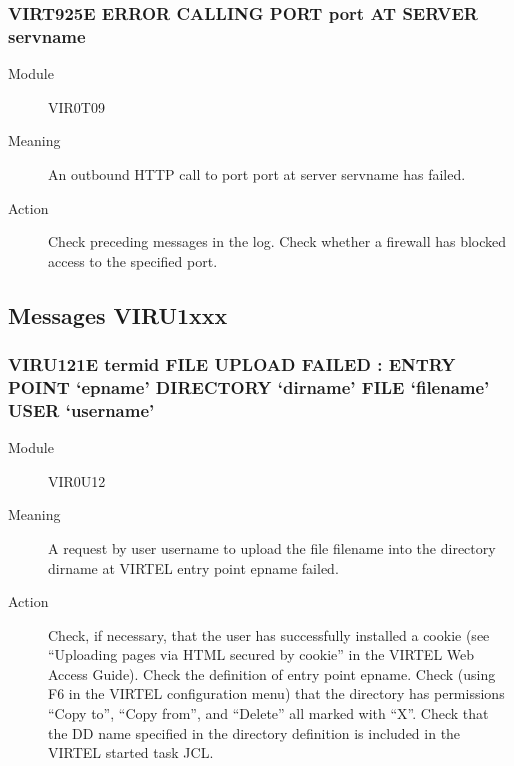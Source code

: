 \documentclass[letterpaper,10pt,english]{sphinxmanual}
\begin{document}
\subsubsection{VIRT925E ERROR CALLING PORT port AT SERVER servname}
\label{\detokenize{messages:virt925e-error-calling-port-port-at-server-servname}}\begin{description}
\item[{Module}] \leavevmode
VIR0T09

\item[{Meaning}] \leavevmode
An outbound HTTP call to port port at server servname has failed.

\item[{Action}] \leavevmode
Check preceding messages in the log. Check whether a firewall has blocked access to the specified port.

\end{description}


\subsection{Messages VIRU1xxx}
\label{\detokenize{messages:messages-viru1xxx}}

\subsubsection{VIRU121E termid FILE UPLOAD FAILED : ENTRY POINT ‘epname’ DIRECTORY ‘dirname’ FILE ‘filename’ USER ‘username’}
\label{\detokenize{messages:viru121e-termid-file-upload-failed-entry-point-epname-directory-dirname-file-filename-user-username}}\begin{description}
\item[{Module}] \leavevmode
VIR0U12

\item[{Meaning}] \leavevmode
A request by user username to upload the file filename into the directory dirname at VIRTEL entry point epname failed.

\item[{Action}] \leavevmode
Check, if necessary, that the user has successfully installed a cookie (see “Uploading pages via HTML secured by cookie” in the VIRTEL Web Access Guide). Check the definition of entry point epname. Check (using F6 in the VIRTEL configuration menu) that the directory has permissions “Copy to”, “Copy from”, and “Delete” all marked with “X”. Check that the DD name specified in the directory definition is included in the VIRTEL started task JCL.

\end{description}
\end{document}
